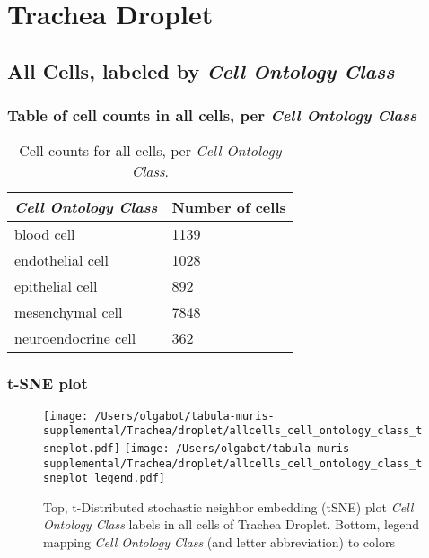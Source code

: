 \clearpage
\section{Trachea Droplet}

\subsection{All Cells, labeled by \emph{Cell Ontology Class}}
\subsubsection{Table of cell counts in all cells, per \emph{Cell Ontology Class}}\begin{table}[h]
\centering
\label{my-label}
\begin{tabular}{@{}ll@{}}
\toprule

\emph{Cell Ontology Class}& Number of cells \\ \midrule
blood cell & 1139 \\

endothelial cell & 1028 \\

epithelial cell & 892 \\

mesenchymal cell & 7848 \\

neuroendocrine cell & 362 \\
\bottomrule
\end{tabular}
\caption{Cell counts for all cells, per \emph{Cell Ontology Class}.}
\end{table}

\clearpage
\subsubsection{t-SNE plot}
\begin{figure}[h]
\centering
\texttt{[image: /Users/olgabot/tabula-muris-supplemental/Trachea/droplet/allcells\_cell\_ontology\_class\_tsneplot.pdf]}
\texttt{[image: /Users/olgabot/tabula-muris-supplemental/Trachea/droplet/allcells\_cell\_ontology\_class\_tsneplot\_legend.pdf]}
\caption{Top, t-Distributed stochastic neighbor embedding (tSNE) plot  \emph{Cell Ontology Class} labels in all cells of Trachea Droplet. Bottom, legend mapping \emph{Cell Ontology Class} (and letter abbreviation) to colors}
\end{figure}


\clearpage


